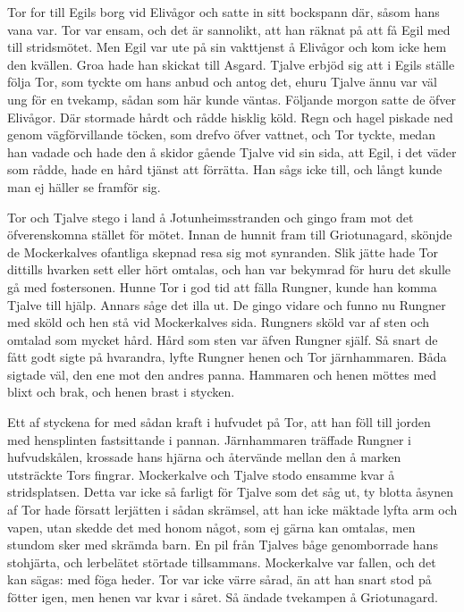 Tor for till Egils borg vid Elivågor och satte in sitt bockspann där,
såsom hans vana var. Tor var ensam, och det är sannolikt, att han räknat
på att få Egil med till stridsmötet. Men Egil var ute på sin vakttjenst
å Elivågor och kom icke hem den kvällen. Groa hade han skickat till
Asgard. Tjalve erbjöd sig att i Egils ställe följa Tor, som tyckte om
hans anbud och antog det, ehuru Tjalve ännu var väl ung för en tvekamp,
sådan som här kunde väntas. Följande morgon satte de öfver Elivågor. Där
stormade hårdt och rådde hisklig köld. Regn och hagel piskade ned genom
vägförvillande töcken, som drefvo öfver vattnet, och Tor tyckte, medan
han vadade och hade den å skidor gående Tjalve vid sin sida, att Egil, i
det väder som rådde, hade en hård tjänst att förrätta. Han sågs icke
till, och långt kunde man ej häller se framför sig.

Tor och Tjalve stego i land å Jotunheimsstranden och gingo fram mot det
öfverenskomna stället för mötet. Innan de hunnit fram till Griotunagard,
skönjde de Mockerkalves ofantliga skepnad resa sig mot synranden. Slik
jätte hade Tor dittills hvarken sett eller hört omtalas, och han var
bekymrad för huru det skulle gå med fostersonen. Hunne Tor i god tid att
fälla Rungner, kunde han komma Tjalve till hjälp. Annars såge det illa
ut. De gingo vidare och funno nu Rungner med sköld och hen stå vid
Mockerkalves sida. Rungners sköld var af sten och omtalad som mycket
hård. Hård som sten var äfven Rungner själf. Så snart de fått godt sigte
på hvarandra, lyfte Rungner henen och Tor järnhammaren. Båda sigtade
väl, den ene mot den andres panna. Hammaren och henen möttes med blixt
och brak, och henen brast i stycken.

Ett af styckena for med sådan kraft i hufvudet på Tor, att han föll till
jorden med hensplinten fastsittande i pannan. Järnhammaren träffade
Rungner i hufvudskålen, krossade hans hjärna och återvände mellan den å
marken utsträckte Tors fingrar. Mockerkalve och Tjalve stodo ensamme
kvar å stridsplatsen. Detta var icke så farligt för Tjalve som det såg
ut, ty blotta åsynen af Tor hade försatt lerjätten i sådan skrämsel, att
han icke mäktade lyfta arm och vapen, utan skedde det med honom något,
som ej gärna kan omtalas, men stundom sker med skrämda barn. En pil från
Tjalves båge genomborrade hans stohjärta, och lerbelätet störtade
tillsammans. Mockerkalve var fallen, och det kan sägas: med föga heder.
Tor var icke värre sårad, än att han snart stod på fötter igen, men
henen var kvar i såret. Så ändade tvekampen å Griotunagard.

